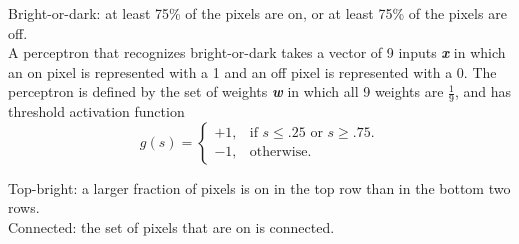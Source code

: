 \documentclass[solution, letterpaper]{cs121}
\begin{document}

\problem{} 

\subproblem Bright-or-dark: at least 75\% of the pixels are on, or at least 75\% of the pixels are off. \\

A perceptron that recognizes bright-or-dark takes a vector of 9 inputs {\textbf{\emph{x}}} in which an on pixel is represented with a 1 and an off pixel is represented with a 0. The perceptron is defined by the set of weights {\textbf{\emph{w}}} in which all 9 weights are $\frac{1}{9}$, and has threshold activation function
\begin{equation*}
  g(s)=\begin{cases}
    +1, & \text{if $s \leq .25$ or $s \geq .75$}.\\
    -1, & \text{otherwise}.
  \end{cases}
\end{equation*}

\subproblem Top-bright: a larger fraction of pixels is on in the top row than in the bottom two rows. \\



\subproblem Connected: the set of pixels that are on is connected. \\




\problem{}

\problem{}

\problem{}
\end{document}
